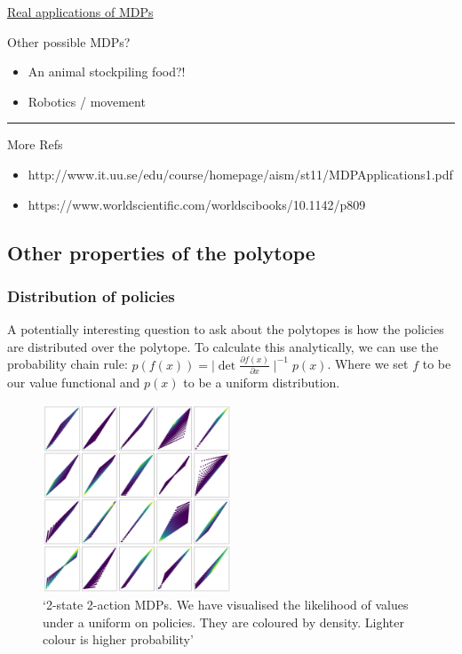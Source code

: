 \href{http://www.it.uu.se/edu/course/homepage/aism/st11/MDPApplications1.pdf}{Real
applications of MDPs}

Other possible MDPs?

\begin{itemize}
\tightlist
\item
  An animal stockpiling food?!
\item
  Robotics / movement
\end{itemize}

\begin{center}\rule{0.5\linewidth}{\linethickness}\end{center}

More Refs

\begin{itemize}
\tightlist
\item
  http://www.it.uu.se/edu/course/homepage/aism/st11/MDPApplications1.pdf
\item
  https://www.worldscientific.com/worldscibooks/10.1142/p809
\end{itemize}


\subsection{Other properties of the polytope}



\subsubsection{Distribution of policies}

A potentially interesting question to ask about the polytopes is how the
policies are distributed over the polytope. To calculate this
analytically, we can use the probability chain rule:
\(p(f(x)) = \mid \det\frac{\partial f(x)}{\partial x}\mid^{-1}p(x)\).
Where we set \(f\) to be our value functional and \(p(x)\) to be a
uniform distribution.

\begin{figure}
\centering
\includegraphics[width=0.5\textwidth,height=0.5\textheight]{../../pictures/figures/polytope_densities.png}
\caption{`2-state 2-action MDPs. We have visualised the likelihood of
values under a uniform on policies. They are coloured by density.
Lighter colour is higher probability'}
\end{figure}

